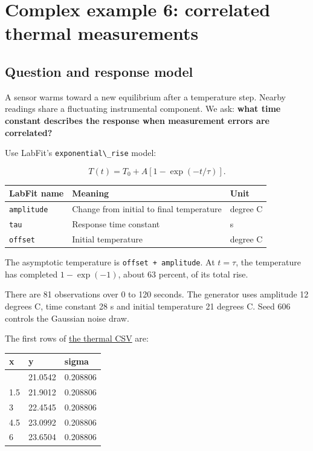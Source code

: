 \documentclass[
  british,
  10pt,
  a4paper,
]{article}
\newcommand{\passthrough}[1]{#1}
\begin{document}
\section{Complex example 6: correlated thermal
measurements}\label{complex-example-6-correlated-thermal-measurements}


\subsection{Question and response
model}\label{question-and-response-model}

A sensor warms toward a new equilibrium after a temperature step. Nearby
readings share a fluctuating instrumental component. We ask:
\textbf{what time constant describes the response when measurement
errors are correlated?}

Use LabFit's \passthrough{\lstinline!exponential\_rise!} model:

\begin{equation}T(t)=T_0+A\left[1-\exp(-t/\tau)\right].\end{equation}

\begin{longtable}[]{@{}lll@{}}
\toprule\noalign{}
LabFit name & Meaning & Unit \\
\midrule\noalign{}
\endhead
\bottomrule\noalign{}
\endlastfoot
\passthrough{\lstinline!amplitude!} & Change from initial to final
temperature & degree C \\
\passthrough{\lstinline!tau!} & Response time constant & s \\
\passthrough{\lstinline!offset!} & Initial temperature & degree C \\
\end{longtable}

The asymptotic temperature is
\passthrough{\lstinline!offset + amplitude!}. At \(t=\tau\), the
temperature has completed \(1-\exp(-1)\), about 63 percent, of its total
rise.

There are 81 observations over 0 to 120 seconds. The generator uses
amplitude 12 degrees C, time constant 28 s and initial temperature 21
degrees C. Seed 606 controls the Gaussian noise draw.

The first rows of \href{data/thermal.csv}{the thermal CSV} are:

\begin{longtable}[]{@{}lll@{}}
\toprule\noalign{}
x & y & sigma \\
\midrule\noalign{}
\endhead
\bottomrule\noalign{}
\endlastfoot
0 & 21.0542 & 0.208806 \\
1.5 & 21.9012 & 0.208806 \\
3 & 22.4545 & 0.208806 \\
4.5 & 23.0992 & 0.208806 \\
6 & 23.6504 & 0.208806 \\
\end{longtable}
\end{document}
